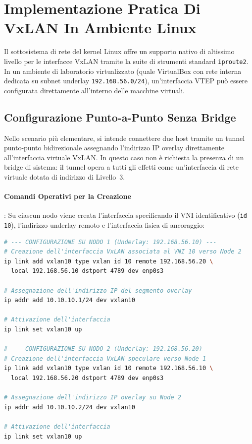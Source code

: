 \documentclass[11pt, a4paper]{article}
\begin{document}
\section{Implementazione Pratica Di VxLAN In Ambiente Linux}

Il sottosistema di rete del kernel Linux offre un supporto nativo di altissimo livello per le interfacce VxLAN tramite la suite di strumenti standard \texttt{iproute2}. In un ambiente di laboratorio virtualizzato (quale VirtualBox con rete interna dedicata su subnet underlay \texttt{192.168.56.0/24}), un'interfaccia VTEP può essere configurata direttamente all'interno delle macchine virtuali.

\subsection{Configurazione Punto-a-Punto Senza Bridge}

Nello scenario più elementare, si intende connettere due host tramite un tunnel punto-punto bidirezionale assegnando l'indirizzo IP overlay direttamente all'interfaccia virtuale VxLAN. In questo caso non è richiesta la presenza di un bridge di sistema: il tunnel opera a tutti gli effetti come un'interfaccia di rete virtuale dotata di indirizzo di Livello~3.


\paragraph{Comandi Operativi per la Creazione}:
Su ciascun nodo viene creata l'interfaccia specificando il VNI identificativo (\texttt{id 10}), l'indirizzo underlay remoto e l'interfaccia fisica di ancoraggio:

\begin{lstlisting}[language=bash, caption={Configurazione VTEP point-to-point su Node 1 e Node 2.}]
# --- CONFIGURAZIONE SU NODO 1 (Underlay: 192.168.56.10) ---
# Creazione dell'interfaccia VxLAN associata al VNI 10 verso Node 2
ip link add vxlan10 type vxlan id 10 remote 192.168.56.20 \
  local 192.168.56.10 dstport 4789 dev enp0s3

# Assegnazione dell'indirizzo IP del segmento overlay
ip addr add 10.10.10.1/24 dev vxlan10

# Attivazione dell'interfaccia
ip link set vxlan10 up

# --- CONFIGURAZIONE SU NODO 2 (Underlay: 192.168.56.20) ---
# Creazione dell'interfaccia VxLAN speculare verso Node 1
ip link add vxlan10 type vxlan id 10 remote 192.168.56.10 \
  local 192.168.56.20 dstport 4789 dev enp0s3

# Assegnazione dell'indirizzo IP overlay su Node 2
ip addr add 10.10.10.2/24 dev vxlan10

# Attivazione dell'interfaccia
ip link set vxlan10 up
\end{lstlisting}
\end{document}
